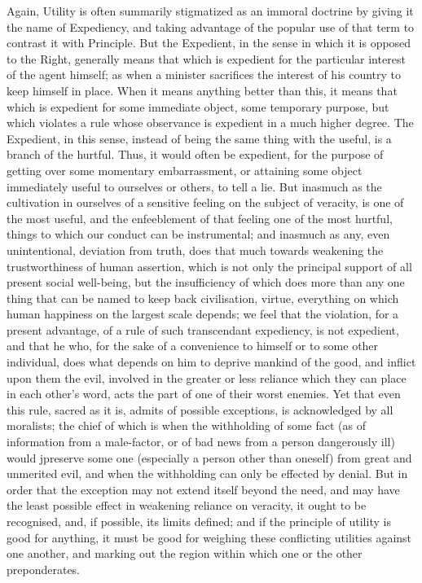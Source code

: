 Again, Utility is often summarily stigmatized as an immoral doctrine
by giving it the name of Expediency, and taking advantage of the
popular use of that term to contrast it with Principle. But the
Expedient, in the sense in which it is opposed to the Right, generally
means that which is expedient for the particular interest of the agent
himself; as when a minister sacrifices the interest of his country to
keep himself  in place. When it means anything better than
this, it means that which is expedient for some immediate object, some
temporary purpose, but which violates a rule whose observance is
expedient in a much higher degree. The Expedient, in this sense,
instead of being the same thing with the useful, is a branch of the
hurtful. Thus, it would often be expedient, for the purpose of getting
over some momentary embarrassment, or attaining some object
immediately useful to ourselves or others, to tell a lie. But inasmuch
as the cultivation in ourselves of a sensitive feeling on the subject
of veracity, is one of the most useful, and the enfeeblement of that
feeling one of the most hurtful, things to which our conduct can be
instrumental; and inasmuch as any, even unintentional, deviation from
truth, does that much towards weakening the trustworthiness of human
assertion, which is not only the principal support of all present
social well-being, but the insufficiency of which does more than any
one thing that can be named to keep back civilisation, virtue,
everything on which human happiness on the largest scale depends; we
feel that the violation, for a present advantage, of a rule of such
transcendant expediency, is not expedient, and that he who, for the
sake of a convenience to himself or to some other individual, does
what depends on him to deprive mankind of the good, and inflict upon
them the evil, involved in the greater or less reliance which they can
place in each other's word, acts the part of one of their worst
enemies. Yet that even this rule, sacred as it is, admits of possible
exceptions, is acknowledged by all moralists; the chief of which is
when the withholding of some fact (as of information from a
male-factor, or of bad news from a person dangerously ill)
would jpreserve some one (especially a person other than oneself) from
great and unmerited evil, and when the withholding can only be
effected by denial. But in order that the exception may not extend
itself beyond the need, and may have the least possible effect in
weakening reliance on veracity, it ought to be recognised, and, if
possible, its limits defined; and if the principle of utility is good
for anything, it must be good for weighing these conflicting utilities
against one another, and marking out the region within which one or
the other preponderates.

